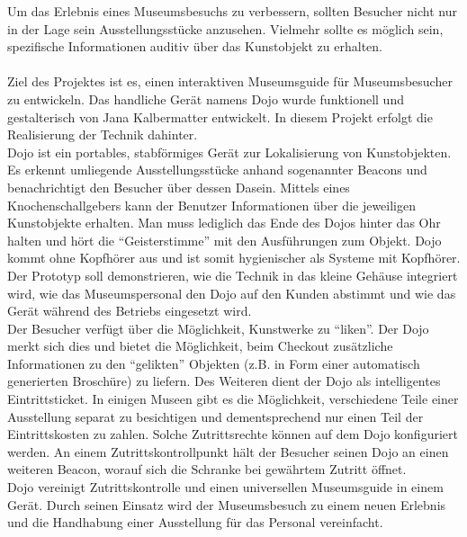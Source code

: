 Um das Erlebnis eines Museumsbesuchs zu verbessern, sollten Besucher nicht nur in der Lage sein Ausstellungsstücke anzusehen. Vielmehr sollte es möglich sein, spezifische Informationen auditiv über das Kunstobjekt zu erhalten.\\\\
Ziel des Projektes ist es, einen interaktiven Museumsguide für Museumsbesucher zu entwickeln. Das handliche Gerät namens Dojo wurde funktionell und gestalterisch von Jana Kalbermatter entwickelt. In diesem Projekt erfolgt die Realisierung der Technik dahinter. \\
Dojo ist ein portables, stabförmiges Gerät zur Lokalisierung von Kunstobjekten. Es erkennt umliegende Ausstellungsstücke anhand sogenannter Beacons und benachrichtigt den Besucher über dessen Dasein. Mittels eines Knochenschallgebers kann der Benutzer Informationen über die jeweiligen Kunstobjekte erhalten. Man muss lediglich das Ende des Dojos hinter das Ohr halten und hört die ``Geisterstimme'' mit den Ausführungen zum Objekt. Dojo kommt ohne Kopfhörer aus und ist somit hygienischer als Systeme mit Kopfhörer.
Der Prototyp soll demonstrieren, wie die Technik in das kleine Gehäuse integriert wird, wie das Museumspersonal den Dojo auf den Kunden abstimmt und wie das Gerät während des Betriebs eingesetzt wird.\\
Der Besucher verfügt über die Möglichkeit, Kunstwerke zu ``liken''. Der Dojo merkt sich dies und bietet die Möglichkeit, beim Checkout zusätzliche Informationen zu den ``gelikten'' Objekten (z.B. in Form einer automatisch generierten Broschüre) zu liefern.
Des Weiteren dient der Dojo als intelligentes Eintrittsticket. In einigen Museen gibt es die Möglichkeit, verschiedene Teile einer Ausstellung separat zu besichtigen und dementsprechend nur einen Teil der Eintrittskosten zu zahlen. Solche Zutrittsrechte können auf dem Dojo konfiguriert werden. An einem Zutrittskontrollpunkt hält der Besucher seinen Dojo an einen weiteren Beacon, worauf sich die Schranke bei gewährtem Zutritt öffnet.\\

Dojo vereinigt Zutrittskontrolle und einen universellen Museumsguide in einem Gerät. Durch seinen Einsatz wird der Museumsbesuch zu einem neuen Erlebnis und die Handhabung einer Ausstellung für das Personal vereinfacht.

